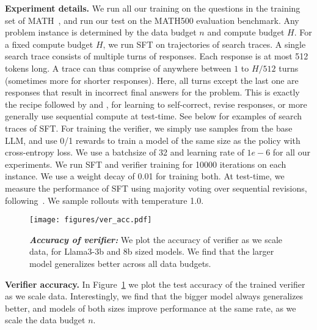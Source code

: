 \textbf{Experiment details.} We run all our training on the questions in the training set of MATH~\cite{hendrycksmath2021}, and run our test on the MATH500 evaluation benchmark. Any problem instance is determined by the data budget $n$ and compute budget $H$. For a fixed compute budget $H$, we run SFT on trajectories of search traces. A single search trace consists of multiple turns of responses. Each response is at most 512 tokens long. A trace can thus comprise of anywhere between $1$ to $H/512$ turns (sometimes more for shorter responses).  Here, all turns except the last one are responses that result in incorrect final answers for the problem. This is exactly the recipe followed by \citet{qu2024recursive} and \citet{snell2024scaling}, for learning to self-correct, revise responses, or more generally use sequential compute at test-time. See below for examples of search traces of SFT. For training the verifier, we simply use samples from the base LLM, and use 0/1 rewards to train a model of the same size as the policy with cross-entropy loss. We use a batchsize of 32 and learning rate of $1e-6$ for all our experiments. We run SFT and verifier training for 10000 iterations on each instance. We use a weight decay of 0.01 for training both. At test-time, we measure the performance of SFT using majority voting over sequential revisions, following~\citet{snell2024scaling}. We sample rollouts with temperature 1.0.
\begin{figure}[!ht]
    \centering
    \texttt{[image: figures/ver\_acc.pdf]}
    \caption{\textbf{\emph{Accuracy of verifier:}} We plot the accuracy of verifier as we scale data, for Llama3-3b and 8b sized models. We find that the larger model generalizes better across  all data budgets.}
    \label{fig:verifier-acc}
\end{figure}

\textbf{Verifier accuracy.} In Figure~\ref{fig:verifier-acc} we plot the test accuracy of the trained verifier as we scale data. Interestingly, we find that the bigger model always generalizes better, and models of both sizes improve performance at the same rate, as we scale the data budget $n$.






